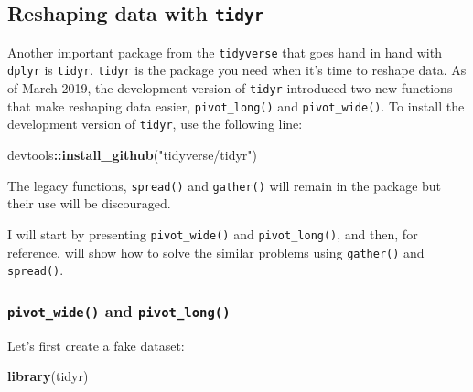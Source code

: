 \documentclass[]{gitbook}
\newenvironment{Shaded}{\begin{snugshade}}{\end{snugshade}}
\newcommand{\KeywordTok}[1]{\textcolor[rgb]{0.13,0.29,0.53}{\textbf{#1}}}
\newcommand{\NormalTok}[1]{#1}
\newcommand{\OperatorTok}[1]{\textcolor[rgb]{0.81,0.36,0.00}{\textbf{#1}}}
\newcommand{\StringTok}[1]{\textcolor[rgb]{0.31,0.60,0.02}{#1}}
\begin{document}
\hypertarget{reshaping-data-with-tidyr}{%
\subsection{\texorpdfstring{Reshaping data with \texttt{tidyr}}{Reshaping data with tidyr}}\label{reshaping-data-with-tidyr}}

Another important package from the \texttt{tidyverse} that goes hand in hand with \texttt{dplyr} is \texttt{tidyr}. \texttt{tidyr}
is the package you need when it's time to reshape data. As of March 2019, the development version
of \texttt{tidyr} introduced two new functions that make reshaping data easier, \texttt{pivot\_long()} and \texttt{pivot\_wide()}.
To install the development version of \texttt{tidyr}, use the following line:

\begin{Shaded}
\begin{Highlighting}[]
\NormalTok{devtools}\OperatorTok{::}\KeywordTok{install_github}\NormalTok{(}\StringTok{"tidyverse/tidyr"}\NormalTok{)}
\end{Highlighting}
\end{Shaded}

The legacy functions, \texttt{spread()} and \texttt{gather()} will remain in the package but their use will be
discouraged.

I will start by presenting \texttt{pivot\_wide()} and \texttt{pivot\_long()}, and then, for reference, will show
how to solve the similar problems using \texttt{gather()} and \texttt{spread()}.

\hypertarget{pivot_wide-and-pivot_long}{%
\subsubsection{\texorpdfstring{\texttt{pivot\_wide()} and \texttt{pivot\_long()}}{pivot\_wide() and pivot\_long()}}\label{pivot_wide-and-pivot_long}}

Let's first create a fake dataset:

\begin{Shaded}
\begin{Highlighting}[]
\KeywordTok{library}\NormalTok{(tidyr)}
\end{Highlighting}
\end{Shaded}
\end{document}
